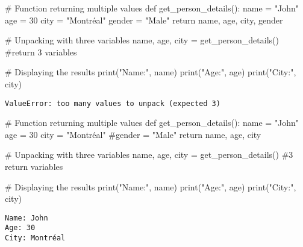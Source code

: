 \documentclass[
]{report}
\newenvironment{Shaded}{\begin{snugshade}}{\end{snugshade}}
\newcommand{\BuiltInTok}[1]{\textcolor[rgb]{0.00,0.23,0.31}{#1}}
\newcommand{\CommentTok}[1]{\textcolor[rgb]{0.37,0.37,0.37}{#1}}
\newcommand{\ControlFlowTok}[1]{\textcolor[rgb]{0.00,0.23,0.31}{#1}}
\newcommand{\DecValTok}[1]{\textcolor[rgb]{0.68,0.00,0.00}{#1}}
\newcommand{\KeywordTok}[1]{\textcolor[rgb]{0.00,0.23,0.31}{#1}}
\newcommand{\NormalTok}[1]{\textcolor[rgb]{0.00,0.23,0.31}{#1}}
\newcommand{\OperatorTok}[1]{\textcolor[rgb]{0.37,0.37,0.37}{#1}}
\newcommand{\StringTok}[1]{\textcolor[rgb]{0.13,0.47,0.30}{#1}}
\begin{document}
\begin{Shaded}
\begin{Highlighting}[]
\CommentTok{\# Function returning multiple values}
\KeywordTok{def}\NormalTok{ get\_person\_details():}
\NormalTok{    name }\OperatorTok{=} \StringTok{"John"}
\NormalTok{    age }\OperatorTok{=} \DecValTok{30}
\NormalTok{    city }\OperatorTok{=} \StringTok{"Montréal"}
\NormalTok{    gender }\OperatorTok{=} \StringTok{"Male"}
    \ControlFlowTok{return}\NormalTok{ name, age, city, gender}

\CommentTok{\# Unpacking with three variables}
\NormalTok{name, age, city }\OperatorTok{=}\NormalTok{ get\_person\_details() }\CommentTok{\#return 3 }
\NormalTok{variables}

\CommentTok{\# Displaying the results}
\BuiltInTok{print}\NormalTok{(}\StringTok{"Name:"}\NormalTok{, name)}
\BuiltInTok{print}\NormalTok{(}\StringTok{"Age:"}\NormalTok{, age)}
\BuiltInTok{print}\NormalTok{(}\StringTok{"City:"}\NormalTok{, city)}
\end{Highlighting}
\end{Shaded}

\begin{verbatim}
ValueError: too many values to unpack (expected 3)
\end{verbatim}

\begin{Shaded}
\begin{Highlighting}[]
\CommentTok{\# Function returning multiple values}
\KeywordTok{def}\NormalTok{ get\_person\_details():}
\NormalTok{    name }\OperatorTok{=} \StringTok{"John"}
\NormalTok{    age }\OperatorTok{=} \DecValTok{30}
\NormalTok{    city }\OperatorTok{=} \StringTok{"Montréal"}
    \CommentTok{\#gender = "Male"}
    \ControlFlowTok{return}\NormalTok{ name, age, city}

\CommentTok{\# Unpacking with three variables}
\NormalTok{name, age, city }\OperatorTok{=}\NormalTok{ get\_person\_details() }\CommentTok{\#3 return variables}

\CommentTok{\# Displaying the results}
\BuiltInTok{print}\NormalTok{(}\StringTok{"Name:"}\NormalTok{, name)}
\BuiltInTok{print}\NormalTok{(}\StringTok{"Age:"}\NormalTok{, age)}
\BuiltInTok{print}\NormalTok{(}\StringTok{"City:"}\NormalTok{, city)}
\end{Highlighting}
\end{Shaded}

\begin{verbatim}
Name: John
Age: 30
City: Montréal
\end{verbatim}
\end{document}
